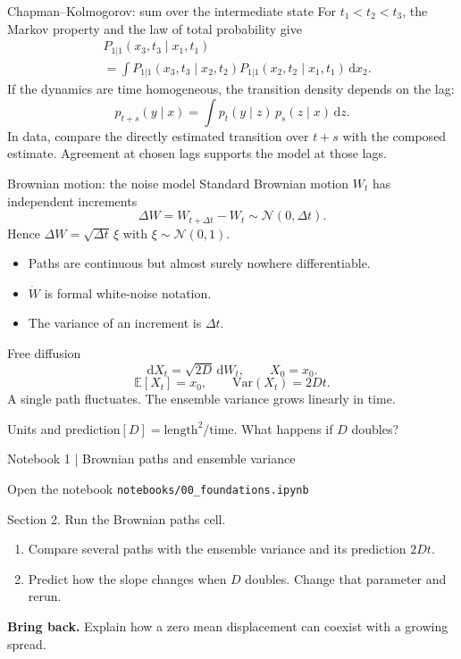 \documentclass[aspectratio=169,10pt]{beamer}
\newcommand{\E}{\mathbb{E}}
\newcommand{\dd}{\mathrm{d}}
\begin{document}
\begin{frame}{Chapman--Kolmogorov: sum over the intermediate state}
For $t_1<t_2<t_3$, the Markov property and the law of total probability give
\[
\begin{aligned}
&P_{1|1}(x_3,t_3\mid x_1,t_1)\\[-.2ex]
&=\int P_{1|1}(x_3,t_3\mid x_2,t_2)
             P_{1|1}(x_2,t_2\mid x_1,t_1)\,\dd x_2.
\end{aligned}
\]
If the dynamics are time homogeneous, the transition density depends on the lag:
\[
p_{t+s}(y\mid x)=\int p_t(y\mid z)\,p_s(z\mid x)\,\dd z.
\]
In data, compare the directly estimated transition over $t+s$ with the composed estimate. Agreement at chosen lags supports the model at those lags.
\end{frame}

\begin{frame}{Brownian motion: the noise model}
Standard Brownian motion $W_t$ has independent increments
\[\Delta W=W_{t+\Delta t}-W_t\sim\mathcal N(0,\Delta t).\]
Hence $\Delta W=\sqrt{\Delta t}\,\xi$ with $\xi\sim\mathcal N(0,1)$.
\begin{itemize}\item Paths are continuous but almost surely nowhere differentiable.\item $\dot W$ is formal white-noise notation.\item The variance of an increment is $\Delta t$.\end{itemize}
\end{frame}

\begin{frame}{Free diffusion}
\[\dd X_t=\sqrt{2D}\,\dd W_t,\qquad X_0=x_0.\]
\[\E[X_t]=x_0,\qquad \mathrm{Var}(X_t)=2Dt.\]
A single path fluctuates. The ensemble variance grows linearly in time.
\begin{block}{Units and prediction}$[D]=\mathrm{length}^2/\mathrm{time}$. What happens if $D$ doubles?\end{block}
\end{frame}

\begin{frame}{Notebook 1 | Brownian paths and ensemble variance}
\begin{block}{Open the notebook}
\texttt{notebooks/00\_foundations.ipynb}\par
Section 2. Run the Brownian paths cell.
\end{block}
\begin{enumerate}
\item Compare several paths with the ensemble variance and its prediction $2Dt$.
\item Predict how the slope changes when $D$ doubles. Change that parameter and rerun.
\end{enumerate}
\textbf{Bring back.} Explain how a zero mean displacement can coexist with a growing spread.
\end{frame}
\end{document}
